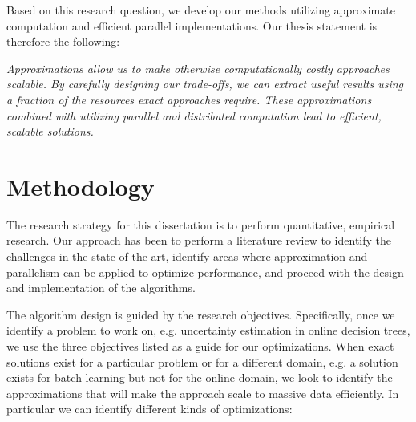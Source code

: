 \noindent
Based on this research question, we develop our methods utilizing approximate computation and efficient parallel implementations. Our thesis statement is therefore the following:

\begin{displayquote}
	\emph{Approximations allow us to make otherwise computationally costly approaches scalable.
	By carefully designing our trade-offs, we can extract useful results using a fraction
	of the resources exact approaches require. These approximations combined with utilizing parallel and distributed computation lead to efficient, scalable solutions.}
\end{displayquote}

\section{Methodology}

The research strategy for this dissertation is to perform quantitative, empirical research.
Our approach has been to perform a literature review to identify the challenges in the
state of the art, identify areas where approximation and parallelism can be applied to
optimize performance, and proceed with the design and implementation of the algorithms.

The algorithm design is guided by the research objectives. Specifically, once we identify a problem
to work on, e.g. uncertainty estimation in online decision trees, we use the three objectives
listed as a guide for our optimizations. When exact solutions exist for a particular problem
or for a different domain, e.g. a solution exists for batch learning but not for the online
domain, we look to identify the approximations that will make the approach scale to massive
data efficiently. In particular we can identify different kinds of optimizations:

